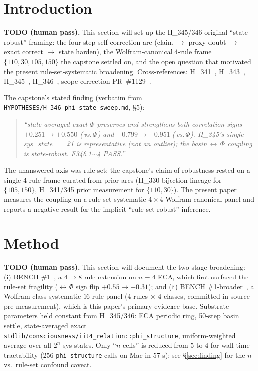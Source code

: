\documentclass[11pt,a4paper]{article}
\newcommand{\bigphi}{\ensuremath{\Phi}}
\newcommand{\verdictref}[1]{\texttt{\detokenize{#1}}}
\begin{document}
\section{Introduction}
\label{sec:intro}

\textbf{TODO (human pass).} This section will set up the H\_345/346
original ``state-robust'' framing: the four-step self-correction arc
(claim $\rightarrow$ proxy doubt $\rightarrow$ exact correct $\rightarrow$
state harden), the Wolfram-canonical 4-rule frame $\{110, 30, 105, 150\}$
the capstone settled on, and the open question that motivated the
present rule-set-systematic broadening. Cross-references:
H\_341~\citep{anima2026h341}, H\_343~\citep{anima2026h343},
H\_345~\citep{anima2026h345}, H\_346~\citep{anima2026h346}, scope
correction PR~\#1129~\citep{anima2026pr1129}.

The capstone's stated finding (verbatim from
\verb|HYPOTHESES/H_346_phi_state_sweep.md|, \S 5):

\begin{quote}
\itshape ``state-averaged exact \bigphi{} preserves and strengthens both
correlation signs --- $+0.251 \to +0.550$
(\verdictref{max_basin}\,vs.\,\bigphi) and $-0.799 \to -0.951$
(\verdictref{n_attr}\,vs.\,\bigphi). H\_345's single sys\_state $=$ 21 is
representative (not an outlier); the basin\,$\leftrightarrow$\,\bigphi{}
coupling is state-robust. F346.1$\sim$4 PASS.''
\end{quote}

The unanswered axis was rule-set: the capstone's claim of robustness rested
on a single 4-rule frame curated from prior arcs (H\_330 bijection lineage
for $\{105, 150\}$, H\_341/345 prior measurement for $\{110, 30\}$). The
present paper measures the coupling on a rule-set-systematic
$4 \times 4$ Wolfram-canonical panel and reports a negative result for
the implicit ``rule-set robust'' inference.

\section{Method}
\label{sec:method}

\textbf{TODO (human pass).} This section will document the two-stage
broadening: (i) BENCH \#1~\citep{anima2026pr1122}, a $4 \to 8$-rule
extension on $n=4$ ECA, which first surfaced the rule-set fragility
(\verdictref{max_basin}$\leftrightarrow$\bigphi{} sign flip
$+0.55 \to -0.31$); and (ii) BENCH \#1-broader~\citep{anima2026pr1131},
a Wolfram-class-systematic $16$-rule panel ($4$ rules $\times$ $4$ classes,
committed in source pre-measurement), which is this paper's primary
evidence base. Substrate parameters held constant from
H\_345/346: ECA periodic ring, 50-step basin settle, state-averaged exact
\verb|stdlib/consciousness/iit4_relation::phi_structure|, uniform-weighted
average over all $2^n$ sys-states. Only ``$n$ cells'' is reduced from $5$
to $4$ for wall-time tractability (256 \verb|phi_structure| calls on Mac
in 57 s); see \S\ref{sec:finding} for the $n$ vs.\ rule-set confound
caveat.
\end{document}
